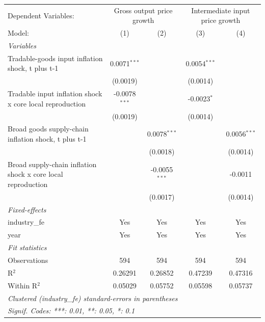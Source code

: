 \begingroup
\centering
\begin{tabular}{lcccc}
   \tabularnewline \midrule \midrule
   Dependent Variables: & \multicolumn{2}{c}{Gross output price growth} & \multicolumn{2}{c}{Intermediate input price growth}\\
   Model:                                                       & (1)             & (2)             & (3)            & (4)\\  
   \midrule
   \emph{Variables}\\
   Tradable-goods input inflation shock, t plus t-1             & 0.0071$^{***}$  &                 & 0.0054$^{***}$ &   \\   
                                                                & (0.0019)        &                 & (0.0014)       &   \\   
   Tradable input inflation shock x core local reproduction     & -0.0078$^{***}$ &                 & -0.0023$^{*}$  &   \\   
                                                                & (0.0019)        &                 & (0.0014)       &   \\   
   Broad goods supply-chain inflation shock, t plus t-1         &                 & 0.0078$^{***}$  &                & 0.0056$^{***}$\\   
                                                                &                 & (0.0018)        &                & (0.0014)\\   
   Broad supply-chain inflation shock x core local reproduction &                 & -0.0055$^{***}$ &                & -0.0011\\   
                                                                &                 & (0.0017)        &                & (0.0014)\\   
   \midrule
   \emph{Fixed-effects}\\
   industry\_fe                                                 & Yes             & Yes             & Yes            & Yes\\  
   year                                                         & Yes             & Yes             & Yes            & Yes\\  
   \midrule
   \emph{Fit statistics}\\
   Observations                                                 & 594             & 594             & 594            & 594\\  
   R$^2$                                                        & 0.26291         & 0.26852         & 0.47239        & 0.47316\\  
   Within R$^2$                                                 & 0.05029         & 0.05752         & 0.05598        & 0.05737\\  
   \midrule \midrule
   \multicolumn{5}{l}{\emph{Clustered (industry\_fe) standard-errors in parentheses}}\\
   \multicolumn{5}{l}{\emph{Signif. Codes: ***: 0.01, **: 0.05, *: 0.1}}\\
\end{tabular}
\par\endgroup
